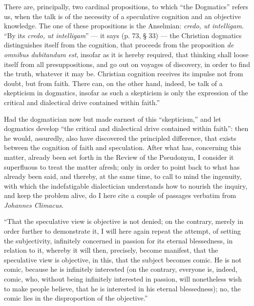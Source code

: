 \documentclass[12pt]{book}
\begin{document}
There are, principally, two cardinal propositions, to which ``the Dogmatics'' refers us, when the talk is of the necessity of a speculative cognition and an objective knowledge. The one of these propositions is the Anselmian: \textit{credo, ut intelligam}. ``By its \textit{credo, ut intelligam}'' --- it says (p. 73, § 33) --- the Christian dogmatics distinguishes itself from the cognition, that proceeds from the proposition \textit{de omnibus dubitandum est}, insofar as it is hereby required, that thinking shall loose itself from all presuppositions, and go out on voyages of discovery, in order to find the truth, whatever it may be. Christian cognition receives its impulse not from doubt, but from faith. There can, on the other hand, indeed, be talk of a skepticism in dogmatics, insofar as such a skepticism is only the expression of the critical and dialectical drive contained within faith.''

Had the dogmatician now but made earnest of this ``skepticism,'' and let dogmatics develop ``the critical and dialectical drive contained within faith'': then he would, assuredly, also have discovered the principled difference, that exists between the cognition of faith and speculation. After what has, concerning this matter, already been set forth in the Review of the Pseudonym, I consider it superfluous to treat the matter afresh; only in order to point back to what has already been said, and thereby, at the same time, to call to mind the ingenuity, with which the indefatigable dialectician understands how to nourish the inquiry, and keep the problem
alive, do I here cite a couple of passages verbatim from \emph{Johannes Climacus}.

``That the speculative view is objective is not denied; on the contrary, merely in order further to demonstrate it, I will here again repeat the attempt, of setting the subjectivity, infinitely concerned in passion for its eternal blessedness, in relation to it, whereby it will then, precisely, become manifest, that the speculative view is objective, in this, that the subject becomes comic. He is not comic, because he is infinitely interested (on the contrary, everyone is, indeed, comic, who, without being infinitely interested in passion, will nonetheless wish to make people believe, that he is interested in his eternal blessedness); no, the comic lies in the disproportion of the objective.''
\end{document}
